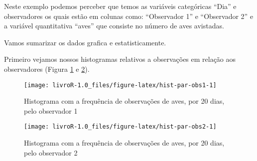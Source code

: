 \documentclass[14pt,titlepage, oneside, openany, a4paper]{book}
\newenvironment{Shaded}{\begin{snugshade}}{\end{snugshade}}
\newcommand{\DataTypeTok}[1]{\textcolor[rgb]{0.13,0.29,0.53}{#1}}
\newcommand{\DecValTok}[1]{\textcolor[rgb]{0.00,0.00,0.81}{#1}}
\newcommand{\FloatTok}[1]{\textcolor[rgb]{0.00,0.00,0.81}{#1}}
\newcommand{\KeywordTok}[1]{\textcolor[rgb]{0.13,0.29,0.53}{\textbf{#1}}}
\newcommand{\NormalTok}[1]{#1}
\newcommand{\OperatorTok}[1]{\textcolor[rgb]{0.81,0.36,0.00}{\textbf{#1}}}
\newcommand{\StringTok}[1]{\textcolor[rgb]{0.31,0.60,0.02}{#1}}
\begin{document}
Neste exemplo podemos perceber que temos as variáveis categóricas ``Dia'' e observadores os quais estão em colunas como: ``Observador 1'' e ``Observador 2'' e a variável quantitativa ``aves'' que consiste no número de aves avistadas.

Vamos sumarizar os dados grafica e estatisticamente.

Primeiro vejamos nossos histogramas relativos a observações em relação aos observadores (Figura \ref{fig:hist-par-obs1} e \ref{fig:hist-par-obs2}).

\begin{Shaded}
\end{Shaded}

\begin{figure}[H]

{\centering \texttt{[image: livroR-1.0\_files/figure-latex/hist-par-obs1-1]} 

}

\caption{Histograma com a frequência de observações de aves, por 20 dias, pelo observador 1}\label{fig:hist-par-obs1}
\end{figure}

\begin{Shaded}
\end{Shaded}

\begin{figure}[H]

{\centering \texttt{[image: livroR-1.0\_files/figure-latex/hist-par-obs2-1]} 

}

\caption{Histograma com a frequência de observações de aves, por 20 dias, pelo observador 2}\label{fig:hist-par-obs2}
\end{figure}
\end{document}
